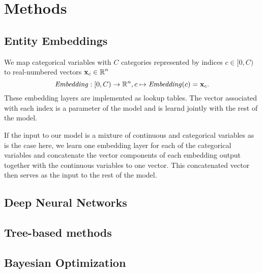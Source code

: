 \section{Methods}%
\label{sec:methods}

\subsection{Entity Embeddings}%
\label{sub:entity_embeddings}

We map categorical variables with $C$ categories represented by indices $c \in
[0,C)$ to real-numbered vectors $\mathbf{x}_c \in \operatorname{\mathbb{R}}^n$
\begin{equation}
    \operatorname{\text{\textit{Embedding}}}: [0,C) \rightarrow \operatorname{\mathbb{R}}^n, c \mapsto \operatorname{\text{\textit{Embedding}}}(c) = \mathbf{x}_c.
\end{equation}
These embedding layers are implemented as lookup tables. The vector associated
with each index is a parameter of the model and is learnd jointly with the rest
of the model.

If the input to our model is a mixture of continuous and categorical variables
as is the case here, we learn one embedding layer for each of the categorical
variables and concatenate the vector components of each embedding output
together with the continuous variables to one vector. This concatenated vector
then serves as the input to the rest of the model.

\subsection{Deep Neural Networks}%
\label{sub:deep_neural_networks}

\subsection{Tree-based methods}%
\label{sub:tree_based_methods}

\subsection{Bayesian Optimization}%
\label{sub:bayesian_optimization}
